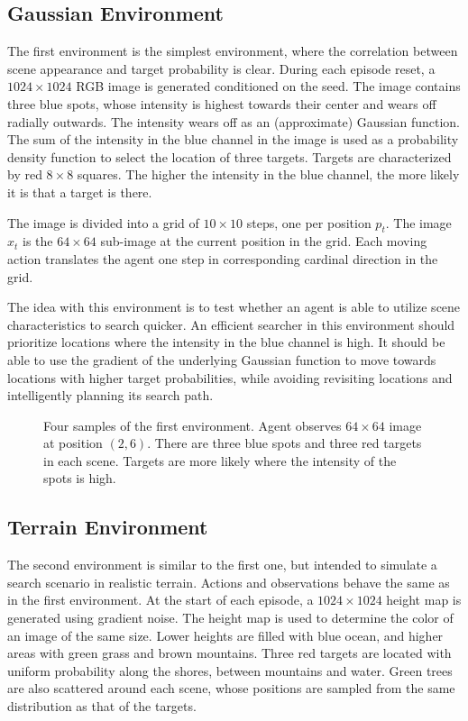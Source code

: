 \subsection{Gaussian Environment}

The first environment is the simplest environment, where the correlation between scene appearance and target probability is clear.
During each episode reset, a \(1024 \times 1024\) RGB image is generated conditioned on the seed.
The image contains three blue spots, whose intensity is highest towards their center and wears off radially outwards.
The intensity wears off as an (approximate) Gaussian function.
The sum of the intensity in the blue channel in the image is used as a probability density function to select the location of three targets.
Targets are characterized by red \(8 \times 8\) squares.
The higher the intensity in the blue channel, the more likely it is that a target is there.

The image is divided into a grid of \(10 \times 10\) steps, one per position \(p_t\).
The image \(x_t\) is the \(64 \times 64\) sub-image at the current position in the grid.
Each moving action translates the agent one step in corresponding cardinal direction in the grid.

The idea with this environment is to test whether an agent is able to utilize scene characteristics to search quicker.
An efficient searcher in this environment should prioritize locations where the intensity in the blue channel is high.
It should be able to use the gradient of the underlying Gaussian function to move towards locations with higher target probabilities, while avoiding revisiting locations and intelligently planning its search path.

\begin{figure}
    \centering
    
    \caption[Gaussian environment]{Four samples of the first environment. Agent observes \(64 \times 64\) image at position \((2, 6)\). There are three blue spots and three red targets in each scene. Targets are more likely where the intensity of the spots is high.}
    \label{fig:gaussian}
\end{figure}

\subsection{Terrain Environment}

The second environment is similar to the first one, but intended to simulate a search scenario in realistic terrain.
Actions and observations behave the same as in the first environment.
At the start of each episode, a \(1024 \times 1024\) height map is generated using gradient noise.
The height map is used to determine the color of an image of the same size.
Lower heights are filled with blue ocean, and higher areas with green grass and brown mountains.
Three red targets are located with uniform probability along the shores, between mountains and water.
Green trees are also scattered around each scene, whose positions are sampled from the same distribution as that of the targets.

